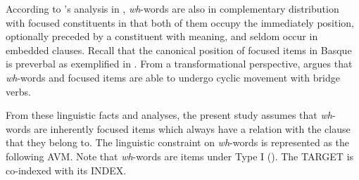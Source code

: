 

\noindent According to \citet{urbina:99}'s analysis in ,
\textit{wh}-words are also in complementary distribution with focused
constituents in that both of them occupy the immediately
 position, optionally preceded by a constituent with
 meaning, and seldom occur in embedded clauses. Recall that the
canonical position of focused items in Basque is preverbal as
exemplified in  .  From a
transformational perspective, \citet{urbina:99} argues that
\textit{wh}-words and focused items are able to undergo cyclic
movement with bridge verbs.



From these linguistic facts and analyses, the present study assumes
that \textit{wh}-words are inherently focused items which always have
a  relation with the clause that they belong to. The
linguistic constraint on \textit{wh}-words is represented as the
following AVM. Note that \textit{wh}-words are 
items under Type I (). The TARGET is
co-indexed with its INDEX.




